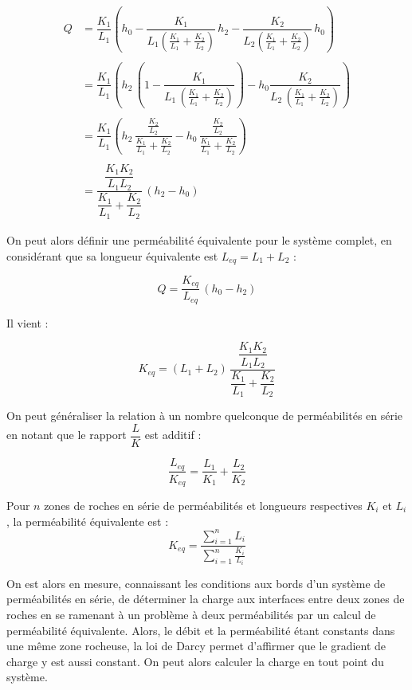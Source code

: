 \documentclass{article}
\begin{document}
\begin{equation}
\begin{split}
Q &= \dfrac{K_1}{L_1} \left(h_0 - \dfrac{K_1}{L_1(\frac{K_1}{L_1} + \frac{K_2}{L_2})}\,h_2 - \dfrac{K_2}{L_2(\frac{K_1}{L_1} + \frac{K_2}{L_2})}\,h_0\right)\\
&\\
& = \dfrac{K_1}{L_1}\left(h_2\,\left(1 -  \dfrac{K_1}{L_1\,(\frac{K_1}{L_1} + \frac{K_2}{L_2})}\right) - h_0\dfrac{K_2}{L_2\,(\frac{K_1}{L_1} + \frac{K_2}{L_2})}\right)\\ 
&\\
& = \dfrac{K_1}{L_1}\left(h_2\,\dfrac{\frac{K_2}{L_2}}{\frac{K_1}{L_1} + \frac{K_2}{L_2}} - h_0\,\dfrac{\frac{K_2}{L_2}}{\frac{K_1}{L_1} + \frac{K_2}{L_2}}\right)\\
&\\
& = \dfrac{\dfrac{K_1K_2}{L_1L_2}}{\dfrac{K_1}{L_1} + \dfrac{K_2}{L_2}}\,(h_2 - h_0)
\end{split}
\end{equation}


On peut alors définir une perméabilité équivalente pour le système complet, en considérant que sa longueur équivalente est $L_{eq} = L_1 + L_2$ :

$$ Q = \frac{K_{eq}}{L_{eq}}\,(h_0 - h_2) $$

Il vient :

$$ K_{eq} = (L_1 + L_2)\,\dfrac{\dfrac{K_1K_2}{L_1L_2}}{\dfrac{K_1}{L_1} + \dfrac{K_2}{L_2}} $$

On peut généraliser la relation à un nombre quelconque de perméabilités en série en notant que le rapport $ \dfrac{L}{K} $ est additif :  

$$ \dfrac{L_{eq}}{K_{eq}} = \dfrac{L_1}{K_1} + \dfrac{L_2}{K_2} $$

Pour $n$ zones de roches en série de perméabilités et longueurs respectives $K_{i}$ et $L_{i}$, la perméabilité équivalente est :
$$K_{eq} = \frac{\sum\limits_{i=1}^{n}L_i}{\sum\limits_{i=1}^{n}\frac{K_i}{L_i}} $$

On est alors en mesure, connaissant les conditions aux bords d’un système de perméabilités en série, de déterminer la charge aux interfaces entre deux zones de roches en se ramenant à un problème à deux perméabilités par un calcul de perméabilité équivalente. Alors, le débit et la perméabilité étant constants dans une même zone rocheuse, la loi de Darcy permet d’affirmer que le gradient de charge y est aussi constant. On peut alors calculer la charge en tout point du système.
\end{document}
